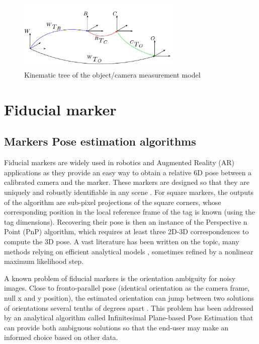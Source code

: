 \begin{figure}
    \centering
    \includegraphics[width=0.7\textwidth]{figures/kin_tree_object.pdf}
    \caption{Kinematic tree of the object/camera measurement model}
    \label{fig:camera_object_chain}
\end{figure}


%
%
\section{Fiducial marker}
\subsection{Markers Pose estimation algorithms}

Fiducial markers are widely used in robotics and Augmented Reality (AR) applications as they provide an easy way to obtain a relative 6D pose 
between a calibrated camera and the marker. These markers are designed so that they are uniquely and robustly identifiable in any scene 
\cite{wang2016iros,romero2018speeded}. For square markers, the outputs of the algorithm are sub-pixel projections of the square corners, whose 
corresponding position in the local reference frame of the tag is known (using the tag dimensions). Recovering their pose is then an instance 
of the Perspective n Point (PnP) algorithm, which requires at least three 2D-3D correspondences to compute the 3D pose. 
A vast literature has been written on the topic, many methods relying on efficient analytical models
\cite{gao2003complete, lepetit2009epnp, collins2014infinitesimal, terzakis2020consistently}, sometimes refined by a nonlinear maximum likelihood step. 

A known problem of fiducial markers is the orientation ambiguity for noisy images. Close to fronto-parallel pose (identical orientation as 
the camera frame, null x and y position), the estimated orientation can jump between two solutions of orientations several tenths of degrees apart 
\cite{collins2014infinitesimal}. 
This problem has been addressed by an analytical algorithm called Infinitesimal Plane-based Pose Estimation \cite{collins2014infinitesimal} that can 
provide both ambiguous solutions so that the end-user may make an informed choice based on other data.

